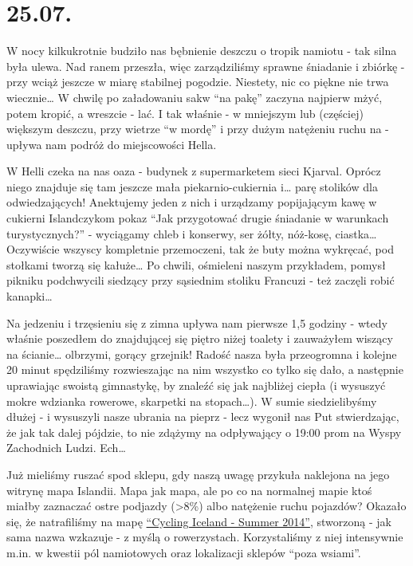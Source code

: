 \chapter*{25.07.}

W nocy kilkukrotnie budziło nas bębnienie deszczu o tropik namiotu - tak silna była ulewa. Nad ranem przeszła, więc zarządziliśmy sprawne śniadanie i zbiórkę - przy wciąż jeszcze w miarę stabilnej pogodzie. Niestety, nic co piękne nie trwa wiecznie… W chwilę po załadowaniu sakw “na pakę” zaczyna najpierw mżyć, potem kropić, a wreszcie - lać. I tak właśnie - w mniejszym lub (częściej) większym deszczu, przy wietrze “w mordę” i przy dużym natężeniu ruchu na  - upływa nam podróż do miejscowości Hella.

W Helli czeka na nas oaza - budynek z supermarketem sieci Kjarval. Oprócz niego znajduje się tam jeszcze mała piekarnio-cukiernia i… parę stolików dla odwiedzających! Anektujemy jeden z nich i urządzamy popijającym kawę w cukierni Islandczykom pokaz “Jak przygotować drugie śniadanie w warunkach turystycznych?” - wyciągamy chleb i konserwy, ser żółty, nóż-kosę, ciastka… Oczywiście wszyscy kompletnie przemoczeni, tak że buty można wykręcać, pod stołkami tworzą się kałuże… Po chwili, ośmieleni naszym przykładem, pomysł pikniku podchwycili siedzący przy sąsiednim stoliku Francuzi - też zaczęli robić kanapki…

Na jedzeniu i trzęsieniu się z zimna upływa nam pierwsze 1,5 godziny - wtedy właśnie poszedłem do znajdującej się piętro niżej toalety i zauważyłem wiszący na ścianie… olbrzymi, gorący grzejnik! Radość nasza była przeogromna i kolejne 20 minut spędziliśmy rozwieszając na nim wszystko co tylko się dało, a następnie uprawiając swoistą gimnastykę, by znaleźć się jak najbliżej ciepła (i wysuszyć mokre wdzianka rowerowe, skarpetki na stopach…). W sumie siedzielibyśmy dłużej - i wysuszyli nasze ubrania na pieprz - lecz wygonił nas Put stwierdzając, że jak tak dalej pójdzie, to nie zdążymy na odpływający o 19:00 prom na Wyspy Zachodnich Ludzi. Ech…


Już mieliśmy ruszać spod sklepu, gdy naszą uwagę przykuła naklejona na jego witrynę mapa Islandii. Mapa jak mapa, ale po co na normalnej mapie ktoś miałby zaznaczać ostre podjazdy (>8\%) albo natężenie ruchu pojazdów? Okazało się, że natrafiliśmy na mapę \href{http://www.vegagerdin.is/media/upplysingar-og-utgafa/Cycling-map.pdf}{“Cycling Iceland - Summer 2014”}, stworzoną - jak sama nazwa wzkazuje - z myślą o rowerzystach. Korzystaliśmy z niej intensywnie m.in. w kwestii pól namiotowych oraz lokalizacji sklepów “poza wsiami”.

